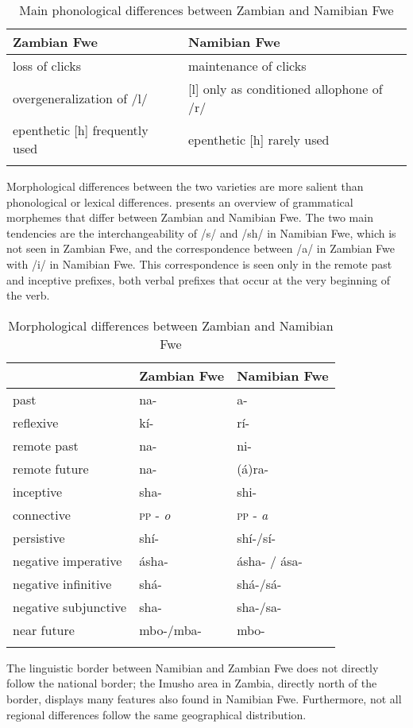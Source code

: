 \begin{table}
\label{bkm:Ref505349490}\caption{\label{tab:1:1}Main phonological differences between Zambian and Namibian Fwe}

\begin{tabularx}{\textwidth}{Xl}
\lsptoprule
Zambian Fwe & Namibian Fwe\\
\midrule 
loss of clicks & maintenance of clicks\\
overgeneralization of /l/ & [l] only as conditioned allophone of /r/\\
epenthetic [h] frequently used & epenthetic [h] rarely used\\
\lspbottomrule
\end{tabularx}
\end{table}
Morphological differences between the two varieties are more salient than phonological or lexical differences.  presents an overview of grammatical morphemes that differ between Zambian and Namibian Fwe. The two main tendencies are the interchangeability of /s/ and /sh/ in Namibian Fwe, which is not seen in Zambian Fwe, and the correspondence between /a/ in Zambian Fwe with /i/ in Namibian Fwe. This correspondence is seen only in the remote past and inceptive prefixes, both verbal prefixes that occur at the very beginning of the verb.

\begin{table}
\label{bkm:Ref491781507}\caption{\label{tab:1:2}Morphological differences between Zambian and Namibian Fwe}

\begin{tabularx}{\textwidth}{XXl}
\lsptoprule
& Zambian Fwe & Namibian Fwe\\
\midrule 
past & na- & a-\\
reflexive & kí- & rí-\\
remote past & na- & ni-\\
remote future & na- & (á)ra-\\
inceptive & sha- & shi-\\
connective & \textsc{pp} - \textit{o} & \textsc{pp} - \textit{a}\\
persistive & shí- & shí-/sí-\\
negative imperative & ásha- & ásha- / ása-\\
negative infinitive & shá- & shá-/sá-\\
negative subjunctive & sha- & sha-/sa-\\
near future & mbo-/mba- & mbo-\\
\lspbottomrule
\end{tabularx}
\end{table}
The linguistic border between Namibian and Zambian Fwe does not directly follow the national border; the Imusho area in Zambia, directly north of the border, displays many features also found in Namibian Fwe. Furthermore, not all regional differences follow the same geographical distribution.

